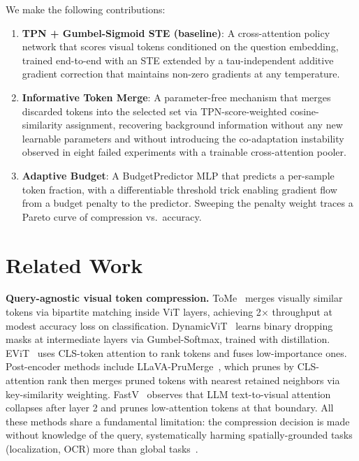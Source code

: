\documentclass{article}
\begin{document}
We make the following contributions:
\begin{enumerate}
\item \textbf{TPN + Gumbel-Sigmoid STE (baseline)}: A cross-attention policy network
  that scores visual tokens conditioned on the question embedding, trained end-to-end
  with an STE extended by a tau-independent additive gradient correction that
  maintains non-zero gradients at any temperature.
\item \textbf{Informative Token Merge}: A parameter-free mechanism that merges discarded
  tokens into the selected set via TPN-score-weighted cosine-similarity assignment,
  recovering background information without any new learnable parameters and without
  introducing the co-adaptation instability observed in eight failed experiments with
  a trainable cross-attention pooler.
\item \textbf{Adaptive Budget}: A BudgetPredictor MLP that predicts a per-sample token
  fraction, with a differentiable threshold trick enabling gradient flow from a budget
  penalty to the predictor. Sweeping the penalty weight traces a Pareto curve of
  compression vs.\ accuracy.
\end{enumerate}

\section{Related Work}
\label{sec:related}

\textbf{Query-agnostic visual token compression.}
ToMe~\cite{bolya2022token} merges visually similar tokens via bipartite matching inside
ViT layers, achieving 2$\times$ throughput at modest accuracy loss on classification.
DynamicViT~\cite{rao2021dynamicvit} learns binary dropping masks at intermediate layers
via Gumbel-Softmax, trained with distillation.
EViT~\cite{liang2022evit} uses CLS-token attention to rank tokens and fuses low-importance
ones.
Post-encoder methods include LLaVA-PruMerge~\cite{shang2024llava}, which prunes by
CLS-attention rank then merges pruned tokens with nearest retained neighbors via
key-similarity weighting.
FastV~\cite{chen2024fastv} observes that LLM text-to-visual attention collapses after
layer 2 and prunes low-attention tokens at that boundary.
All these methods share a fundamental limitation: the compression decision is made
without knowledge of the query, systematically harming spatially-grounded tasks
(localization, OCR) more than global tasks~\cite{chen2024fastv, endo2025feather}.
\end{document}
